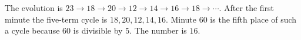 The evolution is $23\to18\to20\to12\to14\to16\to18\to\cdots$. After the first minute the five-term cycle is $18,20,12,14,16$. Minute $60$ is the fifth place of such a cycle because $60$ is divisible by $5$. The number is $\boxed{16}$.
